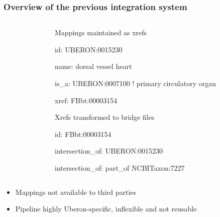 \begin{frame}
  \frametitle{Overview of the previous integration system}

  \begin{columns}
    \begin{column}{.44\textwidth}
    \end{column}
    \begin{column}{.53\textwidth}
      \begin{block}{Mappings maintained as xrefs}\scriptsize\ttfamily
[Term]

id: UBERON:0015230

name: dorsal vessel heart

is\_a: UBERON:0007100 ! primary circulatory organ

xref: FBbt:00003154
      \end{block}
  
      \begin{block}{Xrefs transformed to bridge files}\scriptsize\ttfamily
[Term]

id: FBbt:00003154

intersection\_of: UBERON:0015230

intersection\_of: part\_of NCBITaxon:7227
      \end{block}
    \end{column}
  \end{columns}

  \begin{itemize}
    \item Mappings not available to third parties
    \item Pipeline highly Uberon-specific, inflexible and not reusable
  \end{itemize}


\end{frame}
